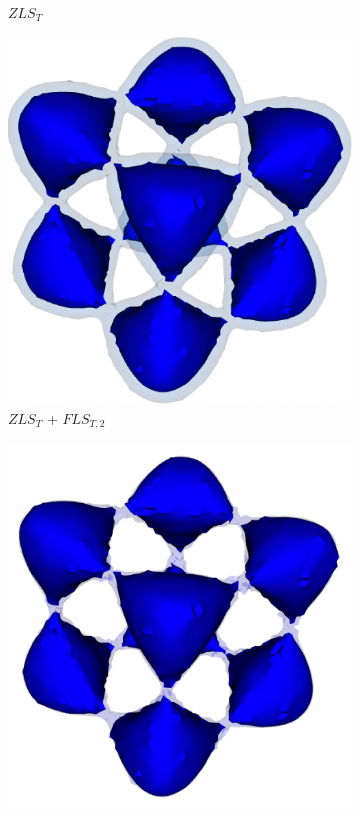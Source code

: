 \begin{figure}[!h]
\begin{subfigure}{0.195\linewidth}
\vspace{-2mm}
\caption{$ZLS_{T}$}
\label{fig:tangle_zls}
\end{subfigure}
\begin{subfigure}{0.195\linewidth}
\centering
\includegraphics[width=0.8\linewidth]{Images/Tangle/fls.pdf}
\vspace{-2mm}
\caption{$ZLS_{T}$ + $FLS_{T,2}$}
\label{fig:tangle_fls}
\end{subfigure}
\begin{subfigure}{0.195\linewidth}
\centering
\includegraphics[width=0.8\linewidth]{Images/Tangle/fcls_68.pdf}

\end{subfigure}
\end{figure}
